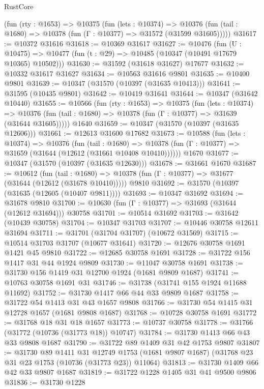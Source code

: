 \begin{lexlean}{RustCore}
\begin{coremodule}
    (fun (rty : @1653) =>
    @10375
      (fun (lets : @10374) =>
      @10376 (fun (tail : @1680) => @10378 (fun (Γ : @10377) => @31572 (@31599 @31605)))))
@31617 := @10372 @31616
@31618 := @10369 @31617
@31627 := @10476
    (fun (U : @10475) => @10477 (fun (t : @29) => @10485 (@10347 (@10491 @17679 @10365) @10502)))
@31630 := @31592 (@31618 @31627) @17677
@31632 := @10332 @31617 @31627
@31634 := @10563 @31616 @9801
@31635 := @10400 @9801
@31639 := @10347 (@31570 (@10397 (@31635 @10413)))
@31641 := @31595 (@10435 @9801)
@31642 := @10419 @31641
@31644 := @10347 (@31642 @10440)
@31655 := @10566
    (fun (rty : @1653) =>
    @10375
      (fun (lets : @10374) =>
      @10376 (fun (tail : @1680) => @10378 (fun (Γ : @10377) => @31639 (@31644 @31605)))))
    @1640
@31659 := @10347 (@31570 (@10397 (@31635 @12606)))
@31661 := @12613 @31600 @17682
@31673 := @10588
    (fun (lets : @10374) =>
    @10376
      (fun (tail : @1680) =>
      @10378 (fun (Γ : @10377) => @31659 (@31644 (@12612 (@31661 @10408 @10410))))))
    @1670
@31677 := @10347 (@31570 (@10397 (@31635 @12630)))
@31678 := @31661 @1670
@31687 := @10612
    (fun (tail : @1680) => @10378 (fun (Γ : @10377) => @31677 (@31644 (@12612 (@31678 @10410)))))
    @9810
@31692 := @31570 (@10397 (@31635 (@12605 (@10407 @9811))))
@31693 := @10347 @31692
@31694 := @31678 @9810
@31700 := @10630 (fun (Γ : @10377) => @31693 (@31644 (@12612 @31694))) @30758
@31701 := @10514 @31692
@31703 := @31642 (@10439 @30758)
@31704 := @10347 @31703
@31707 := @10446 @30758 @12611 @31694
@31711 := @31701 (@31704 @31707) (@10672 @31569)
@31715 := @10514 @31703 @31707 (@10677 @31641)
@31720 := @12676 @30758 @1691 @1421 @45 @9810
@31722 := @12685 @30758 @1691
@31728 := @31722 @156 @1417 @31 @44 @1924 @9809
@31730 := @11047 @30758 @1691
@31738 := @31730 @156 @1419 @31 @12700 @1924 (@1681 @9809 @1687)
@31741 := @10763 @30758 @1691 @31
@31746 := @31738 (@31741 @155 @1924 @11688 @11692)
@31752 := @31730 @1417 @66 @44 @33 @9809 @1687
@31758 := @31722 @54 @1413 @31 @43 @1657 @9808
@31766 := @31730 @54 @1415 @31 @12728 @1657 (@1681 @9808 @1687)
@31768 := @10728 @30758 @1691
@31772 := @31768 @18 @31 @18 @1657
@31773 := @10737 @30758
@31778 := @31766 (@31772 (@10736 (@31773 @18)) @10747)
@31784 := @31730 @1413 @66 @43 @33 @9808 @1687
@31790 := @31722 @89 @1409 @31 @42 @1753 @9807
@31807 := @31730
    @89
    @1411
    @31
    @12749
    @1753
    (@1681 @9807 @1687)
    (@31768 @23 @31 @23 @1753 (@10736 (@31773 @23)) @11064)
@31813 := @31730 @1409 @66 @42 @33 @9807 @1687
@31819 := @31722 @1228 @1405 @31 @41 @9500 @9806
@31836 := @31730
    @1228

\end{coremodule}
\end{lexlean}
